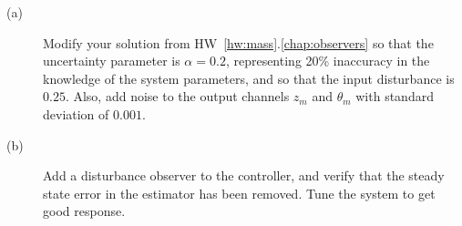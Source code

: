 \begin{description}
\item[(a)] Modify your solution from HW~\ref{hw:mass}.\ref{chap:observers} so
that the uncertainty parameter is $\alpha=0.2$, representing 20\% inaccuracy in the knowledge of the system parameters, and so that the input disturbance is $0.25$. Also, add noise to the output channels $z_m$ and $\theta_m$ with standard deviation of $0.001$.  
\item[(b)] Add a disturbance observer to the controller, and verify that the steady state error in the estimator has been removed.  Tune the system to get good response.
\end{description}